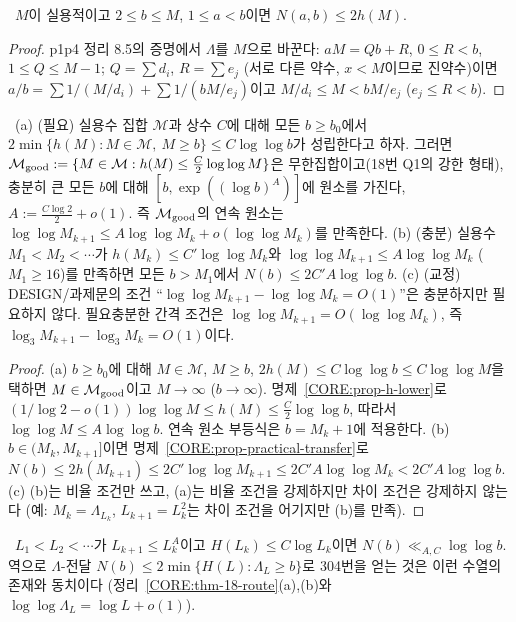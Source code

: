 \begin{proposition}[실용수 전달]\label{CORE:prop-practical-transfer}
\PROVED\ $M$이 실용적이고 $2\le b\le M$, $1\le a<b$이면 $N(a,b)\le2h(M)$.
\end{proposition}
\begin{proof}
p1p4 정리 8.5의 증명에서 $\Lambda$를 $M$으로 바꾼다: $aM=Qb+R$, $0\le R<b$, $1\le Q\le M-1$; $Q=\sum d_i$, $R=\sum e_j$ (서로 다른 약수, $x<M$이므로 진약수)이면 $a/b=\sum1/(M/d_i)+\sum1/(bM/e_j)$이고 $M/d_i\le M<bM/e_j$ ($e_j\le R<b$).
\end{proof}

\begin{theorem}\label{CORE:thm-18-route}
\PROVED\ (a) (필요) 실용수 집합 $\mathcal M$과 상수 $C$에 대해 모든 $b\ge b_0$에서 $2\min\{h(M):M\in\mathcal M,\ M\ge b\}\le C\log\log b$가 성립한다고 하자. 그러면 $\mathcal M_{\rm good}:=\{M\in\mathcal M: h(M)\le\frac C2\log\log M\}$은 무한집합이고(18번 Q1의 강한 형태), 충분히 큰 모든 $b$에 대해 $[b,\exp((\log b)^{A})]$에 원소를 가진다, $A:=\frac{C\log2}{2}+o(1)$. 즉 $\mathcal M_{\rm good}$의 연속 원소는 $\log\log M_{k+1}\le A\log\log M_k+o(\log\log M_k)$를 만족한다.
(b) (충분) 실용수 $M_1<M_2<\cdots$가 $h(M_k)\le C'\log\log M_k$와 $\log\log M_{k+1}\le A\log\log M_k$ ($M_1\ge16$)를 만족하면 모든 $b>M_1$에서 $N(b)\le2C'A\log\log b$.
(c) (교정) DESIGN/과제문의 조건 ``$\log\log M_{k+1}-\log\log M_k=O(1)$''은 충분하지만 필요하지 않다. 필요충분한 간격 조건은 $\log\log M_{k+1}=O(\log\log M_k)$, 즉 $\log_3M_{k+1}-\log_3M_k=O(1)$이다.
\end{theorem}
\begin{proof}
(a) $b\ge b_0$에 대해 $M\in\mathcal M$, $M\ge b$, $2h(M)\le C\log\log b\le C\log\log M$을 택하면 $M\in\mathcal M_{\rm good}$이고 $M\to\infty$ ($b\to\infty$). 명제~\ref{CORE:prop-h-lower}로 $(1/\log2-o(1))\log\log M\le h(M)\le\frac C2\log\log b$, 따라서 $\log\log M\le A\log\log b$. 연속 원소 부등식은 $b=M_k+1$에 적용한다.
(b) $b\in(M_k,M_{k+1}]$이면 명제~\ref{CORE:prop-practical-transfer}로 $N(b)\le2h(M_{k+1})\le2C'\log\log M_{k+1}\le2C'A\log\log M_k<2C'A\log\log b$.
(c) (b)는 비율 조건만 쓰고, (a)는 비율 조건을 강제하지만 차이 조건은 강제하지 않는다 (예: $M_k=\Lambda_{L_k}$, $L_{k+1}=L_k^2$는 차이 조건을 어기지만 (b)를 만족).
\end{proof}

\begin{corollary}[희소한 수열 위의 SP1으로 충분]\label{CORE:cor-sparse-SP1}
\PROVED\ $L_1<L_2<\cdots$가 $L_{k+1}\le L_k^{A}$이고 $H(L_k)\le C\log L_k$이면 $N(b)\ll_{A,C}\log\log b$. 역으로 $\Lambda$-전달 $N(b)\le2\min\{H(L):\Lambda_L\ge b\}$로 304번을 얻는 것은 이런 수열의 존재와 동치이다 (정리~\ref{CORE:thm-18-route}(a),(b)와 $\log\log\Lambda_L=\log L+o(1)$).
\end{corollary}

